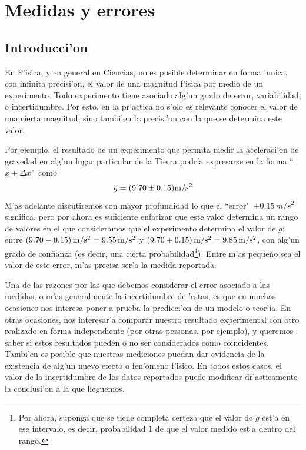 \documentclass[a4paper]{report}
\begin{document}
\chapter{Medidas y errores}

\section{Introducci'on}

En F'isica, y en general en Ciencias, no es posible determinar en forma 'unica, con infinita precisi'on, el valor de una magnitud f'isica por medio de un experimento. Todo experimento tiene asociado alg'un grado de error, variabilidad, o incertidumbre. Por esto, en la pr'actica no s'olo es relevante conocer el valor de una cierta magnitud, sino tambi'en la precisi'on con la que se determina este valor. 

Por ejemplo, el resultado de un experimento que permita medir la aceleraci'on de gravedad en alg'un lugar particular de la Tierra podr'a expresarse en la forma ``$x\pm\Delta x$"\, como
\begin{equation}
g = (9.70\pm 0.15) {\rm m/s^2}
\end{equation}
M'as adelante discutiremos con mayor profundidad lo que el ``error"\, $\pm 0.15\,m/s^2$ significa, pero por ahora es suficiente enfatizar que este valor determina un rango de valores en el que consideramos que el experimento determina el valor de $g$: entre $(9.70-0.15)\,{\rm m/s^2} = 9.55\,{\rm m/s^2}$ y $(9.70+0.15)\,{\rm m/s^2} = 9.85 \,{\rm m/s^2}$, con alg'un grado de confianza (es decir, una cierta probabilidad\footnote{Por ahora, suponga que se tiene completa certeza que el valor de $g$ est'a en ese intervalo, es decir, probabilidad $1$ de que el valor medido est'a dentro del rango.}). Entre m'as peque\~no sea el valor de este error, m'as precisa ser'a la medida reportada.

Una de las razones por las que debemos considerar el error asociado a las medidas, o m'as generalmente la incertidumbre de 'estas, es que en muchas ocasiones nos interesa poner a prueba la predicci'on de un modelo o teor'ia. En otras ocasiones, nos interesar'a comparar nuestro resultado experimental con otro realizado en forma independiente (por otras personas, por ejemplo), y queremos saber si estos resultados pueden o no ser considerados como coincidentes. Tambi'en es posible que nuestras mediciones puedan dar evidencia de la existencia de alg'un nuevo efecto o fen'omeno f'isico. En todos estos casos, el valor de la incertidumbre de los datos reportados puede modificar dr'asticamente la conclusi'on a la que lleguemos.
\end{document}
